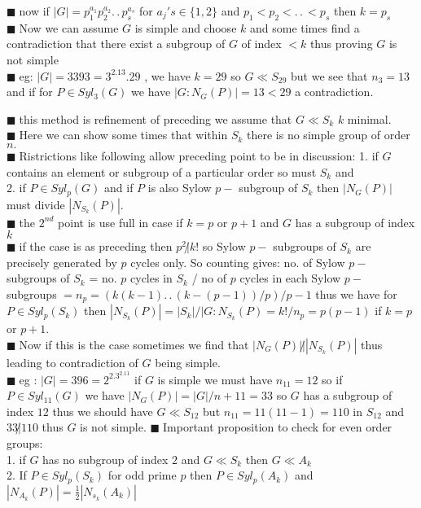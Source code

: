 \documentclass[11pt]{extarticle}
\newcommand{\ck}{.\,.\,}
\newcommand{\y}{$\blacksquare\;$}
\newcommand{\tbx}[2][]{
	\begin{tcolorbox}[enhanced,breakable,size=small,colback=black!2!white,title={#1},arc is angular, arc=1.5mm,drop fuzzy shadow]
		#2
	\end{tcolorbox}
}
\begin{document}
\begin{multicols}{2}
{\y now if $ |G|=p_1^{a_1}p_2^{a_2}\ck p_s^{a_s} $ for $ a_j's\in \{1,2\} $ and $ p_1<p_2<\ck<p_s $ then $ k=p_s $\\
\y Now we can assume $ G $ is simple and choose $ k $ and some times find a contradiction that there exist a subgroup of $ G $ of index $ <k $ thus proving $ G $ is not simple\\
\y eg: $ |G|=3393=3^2.13.29 $ , we have $ k=29 $ so $ G\ll S_{29} $ but we see that $ n_3=13 $ and if for $ P\in Syl_3(G) $ we have $ |G:N_G(P)|=13 <29$ a contradiction. }
\tbx[3. Permutation representation ]{
\y this method is refinement of preceding we assume that $ G\ll S_k $ $ k $ minimal. \\
\y Here we can show some times that within $ S_k $ there is no simple group of order $ n .$ \\
\y Ristrictions like following allow preceding point to be in discussion:
1. if $ G $ contains an element or subgroup of a particular order so must $ S_k $ and\\
2. if $ P\in Syl_p(G) $ and if $ P $ is also Sylow $ p- $ subgroup of $ S_k $ then $ |N_G(P)| $ must divide $ |N_{S_k}(P)| $.\\
\y the $ 2^{nd} $ point is use full in case if $ k=p $ or $ p+1 $ and $ G $ has a subgroup of index $ k $\\
\y if the case is as preceding then $ p^2\not|k! $ so Sylow $ p- $ subgroups of $ S_k $ are precisely generated by $ p $ cycles only. So counting gives: no. of Sylow $ p- $ subgroups of $ S_k $ = no. $ p $ cycles in $ S_k $ / no of $ p $ cycles in each Sylow $ p- $ subgroups $ =n_p=(k(k-1)\ck (k-(p-1))/p)/p-1 $ thus we have for $ P\in Syl_p({S_k}) $ then $ |N_{S_k}(P)| =|S_k|/|G:N_{S_k}(P)=k!/n_p=p(p-1)$ if $ k=p $ or $ p+1 .$ \\
\y Now if this is the case sometimes we find that $ |N_G(P)|\not| |N_{S_k}(P)| $ thus leading to contradiction of $ G$  being simple.\\
\y eg : $ |G|=396=2^2.3^2.11 $ if $ G $ is simple we must have $ n_11=12 $ so if $ P\in Syl_{11}(G) $ we have $ |N_G(P)|=|G|/n+{11}=33 $ so $ G $ has a subgroup of index $ 12 $ thus we should have $ G\ll S_{12} $ but $ n_{11}=11(11-1)=110 $ in $ S_12 $ and $ 33\not|110 $ thus $ G $ is not simple. 
\y Important proposition to check for even order groups:\\
1. if $ G $ has no subgroup of index $ 2 $ and $ G\ll S_k $ then $ G\ll A_k $ \\
2. If $ P\in Syl_p(S_k) $ for odd prime $ p $ then $ P\in Syl_p(A_k) $ and $ |N_{A_k}(P)|=\frac{ 1 }{2} |N_{s_k}(A_k)| $ \\
}
\end{multicols}
\end{document}
